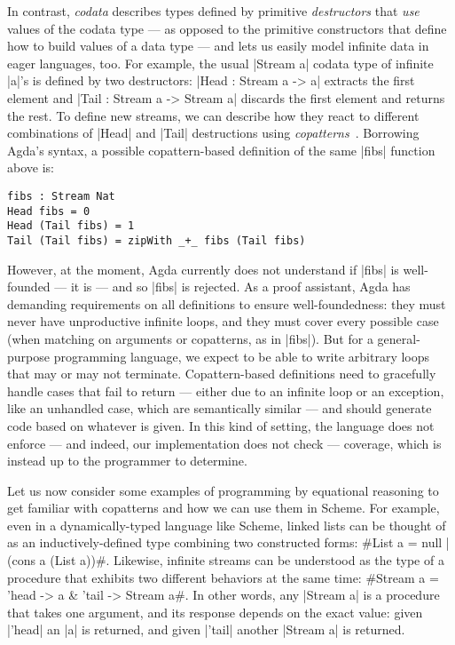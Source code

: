 In contrast, \emph{codata} describes types defined by primitive \emph{destructors} that \emph{use} values of the codata type --- as opposed to the primitive constructors that define how to build values of a data type --- and lets us easily model infinite data in eager languages, too.
For example, the usual \agda|Stream a| codata type of infinite \agda|a|'s is defined by two destructors: \agda|Head : Stream a -> a| extracts the first element and \agda|Tail : Stream a -> Stream a| discards the first element and returns the rest.
To define new streams, we can describe how they react to different combinations of \agda|Head| and \agda|Tail| destructions using \emph{copatterns}~\cite{APTS2013C}.
Borrowing Agda's syntax, a possible copattern-based definition of the same \agda|fibs| function above is:
\begin{verbatim}
fibs : Stream Nat
Head fibs = 0
Head (Tail fibs) = 1
Tail (Tail fibs) = zipWith _+_ fibs (Tail fibs)
\end{verbatim}
However, at the moment, Agda currently does not understand if \agda|fibs| is well-founded --- it is --- and so \agda|fibs| is rejected.
As a proof assistant, Agda has demanding requirements on all definitions to ensure well-foundedness:
they must never have unproductive infinite loops, and they must cover every possible case (when matching on arguments or copatterns, as in \agda|fibs|).
But for a general-purpose programming language, we expect to be able to write arbitrary loops that may or may not terminate.
Copattern-based definitions need to gracefully handle cases that fail to return --- either due to an infinite loop or an exception, like an unhandled case, which are semantically similar \cite{ImpreciseExceptions} --- and should generate code based on whatever is given.
In this kind of setting, the language does not enforce --- and indeed, our implementation does not check --- coverage, which is instead up to the programmer to determine.

Let us now consider some examples of programming by equational reasoning to get familiar with copatterns and how we can use them in Scheme.
For example, even in a dynamically-typed language like Scheme, linked lists can be thought of as an inductively-defined type combining two constructed forms: \scm#List a = null | (cons a (List a))#.
Likewise, infinite streams can be understood as the type of a procedure that exhibits two different behaviors at the same time: \scm#Stream a = 'head -> a & 'tail -> Stream a#.
In other words, any \scm|Stream a| is a procedure that takes one argument, and its response depends on the exact value: given \scm|'head| an \scm|a| is returned, and given \scm|'tail| another \scm|Stream a| is returned.

